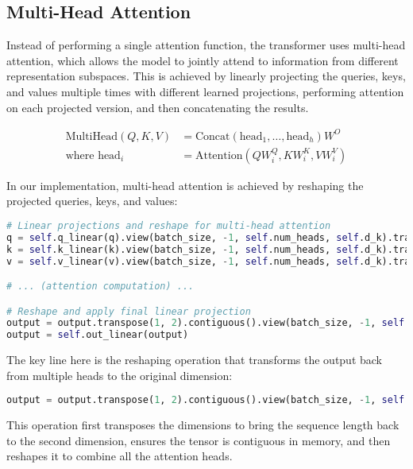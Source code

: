 \documentclass{article}
\begin{document}
\subsection{Multi-Head Attention}

Instead of performing a single attention function, the transformer uses multi-head attention, which allows the model to jointly attend to information from different representation subspaces. This is achieved by linearly projecting the queries, keys, and values multiple times with different learned projections, performing attention on each projected version, and then concatenating the results.

\begin{align}
\text{MultiHead}(Q, K, V) &= \text{Concat}(\text{head}_1, \ldots, \text{head}_h)W^O \\
\text{where } \text{head}_i &= \text{Attention}(QW_i^Q, KW_i^K, VW_i^V)
\end{align}

In our implementation, multi-head attention is achieved by reshaping the projected queries, keys, and values:

\begin{lstlisting}[language=Python, caption=Multi-Head Attention]
# Linear projections and reshape for multi-head attention
q = self.q_linear(q).view(batch_size, -1, self.num_heads, self.d_k).transpose(1, 2)
k = self.k_linear(k).view(batch_size, -1, self.num_heads, self.d_k).transpose(1, 2)
v = self.v_linear(v).view(batch_size, -1, self.num_heads, self.d_k).transpose(1, 2)

# ... (attention computation) ...

# Reshape and apply final linear projection
output = output.transpose(1, 2).contiguous().view(batch_size, -1, self.d_model)
output = self.out_linear(output)
\end{lstlisting}

The key line here is the reshaping operation that transforms the output back from multiple heads to the original dimension:

\begin{lstlisting}[language=Python]
output = output.transpose(1, 2).contiguous().view(batch_size, -1, self.d_model)
\end{lstlisting}

This operation first transposes the dimensions to bring the sequence length back to the second dimension, ensures the tensor is contiguous in memory, and then reshapes it to combine all the attention heads.
\end{document}
